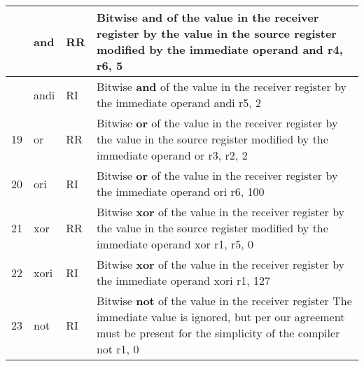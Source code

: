 \documentclass{article}
\newcommand{\St}[1]{{\fontfamily{qcr}\selectfont #1}}
\newcommand{\Ss}[1]{{\fontfamily{cmss}\selectfont #1}}
\begin{document}
{\begin{table*}[h!]
\begin{tabular}{| >{\centering\arraybackslash} m{1cm} | >{\centering\arraybackslash} m{1.4cm} | >{\centering\arraybackslash} m{1.2cm} | m{11.6cm} |}
 \hline
 
 17 & \St{and} & \Ss{RR} &
 
 Bitwise \textbf{and} of the value in the receiver register by the value \newline
 in the source register modified by the immediate operand \newline
 \St{and r4, r6, 5} \\
 
 \hline
 
 18 & \St{andi} & \Ss{RI} &
 
 Bitwise \textbf{and} of the value in the receiver register by the immediate operand \newline
 \St{andi r5, 2} \\
 
 \hline
 
 19 & \St{or} & \Ss{RR} &
 
 Bitwise \textbf{or} of the value in the receiver register by the value \newline
 in the source register modified by the immediate operand \newline
 \St{or r3, r2, 2} \\
 
 \hline
 
 20 & \St{ori} & \Ss{RI} &
 
 Bitwise \textbf{or} of the value in the receiver register by the immediate operand \newline
 \St{ori r6, 100} \\
 
 \hline
 
 21 & \St{xor} & \Ss{RR} &
 
 Bitwise \textbf{xor} of the value in the receiver register by the value \newline
 in the source register modified by the immediate operand \newline
 \St{xor r1, r5, 0} \\
 
 \hline
 
 22 & \St{xori} & \Ss{RI} &
 
 Bitwise \textbf{xor} of the value in the receiver register by the immediate operand \newline
 \St{xori r1, 127} \\
 
 \hline
 
 23 & \St{not} & \Ss{RI} &
 
 Bitwise \textbf{not} of the value in the receiver register \newline
 The immediate value is ignored, but per our agreement must be present \newline 
 for the simplicity of the compiler \newline
 \St{not r1, 0} \\
 

\end{tabular}
\end{table*}}
\end{document}
